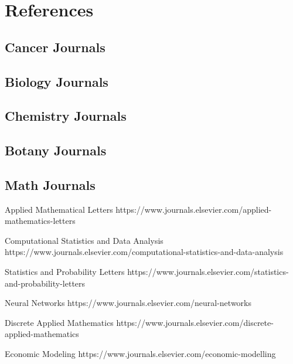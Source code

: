 \section{References}

\subsection{Cancer Journals}

\subsection{Biology Journals}

\subsection{Chemistry Journals}

\subsection{Botany Journals}

\subsection{Math Journals}

 Applied Mathematical Letters
\newblock https://www.journals.elsevier.com/applied-mathematics-letters

Computational Statistics and Data Analysis
\newblock https://www.journals.elsevier.com/computational-statistics-and-data-analysis

Statistics and Probability Letters
\newblock https://www.journals.elsevier.com/statistics-and-probability-letters

Neural Networks
\newblock https://www.journals.elsevier.com/neural-networks

Discrete Applied Mathematics
\newblock https://www.journals.elsevier.com/discrete-applied-mathematics

Economic Modeling
\newblock https://www.journals.elsevier.com/economic-modelling



